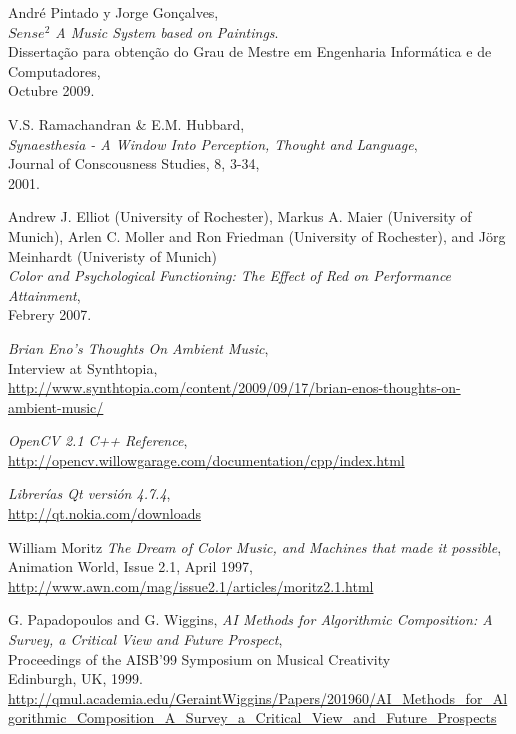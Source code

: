\begin{thebibliography}{9}
  André Pintado y Jorge Gonçalves,\\
  \emph{$Sense^{2}$ A Music System based on Paintings}.\\
  Dissertação para obtenção do Grau de Mestre em Engenharia Informática e de Computadores,\\
  Octubre 2009.

  V.S. Ramachandran \& E.M. Hubbard,\\
  \emph{Synaesthesia - A Window Into Perception, Thought and Language},\\
  Journal of Conscousness Studies, 8, 3-34,\\
  2001.

  Andrew J. Elliot (University of Rochester), Markus A. Maier (University of Munich), Arlen C. Moller and Ron Friedman (University of Rochester), and Jörg Meinhardt (Univeristy of Munich)\\
  \emph{Color and Psychological Functioning: The Effect of Red on Performance Attainment},\\
  Febrery 2007.  

  \emph{Brian Eno's Thoughts On Ambient Music},\\
  Interview at Synthtopia,\\
  \url{http://www.synthtopia.com/content/2009/09/17/brian-enos-thoughts-on-ambient-music/}

  \emph{OpenCV 2.1 C++ Reference},\\
  \url{http://opencv.willowgarage.com/documentation/cpp/index.html}

  \emph{Librerías Qt versión 4.7.4},\\
  \url{http://qt.nokia.com/downloads}

 William Moritz
 \emph{The Dream of Color Music, and Machines that made it possible},\\
 Animation World, Issue 2.1, April 1997,\\ 
 \url{http://www.awn.com/mag/issue2.1/articles/moritz2.1.html}

 G. Papadopoulos and G. Wiggins,
 \emph{AI Methods for Algorithmic Composition: A Survey, a Critical View  and Future Prospect},\\
 Proceedings of the AISB’99 Symposium on Musical Creativity\\
 Edinburgh, UK, 1999.\\
 \url{http://qmul.academia.edu/GeraintWiggins/Papers/201960/AI_Methods_for_Algorithmic_Composition_A_Survey_a_Critical_View_and_Future_Prospects}


\end{thebibliography}
